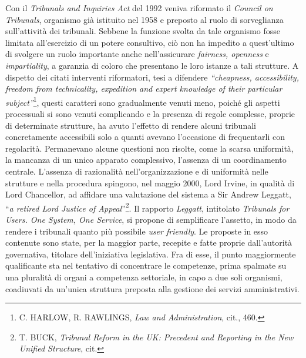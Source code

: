 \documentclass[12pt,it,a4paper,]{report}
\begin{document}
Con il \emph{Tribunals and Inquiries Act} del 1992 veniva riformato il
\emph{Council on Tribunals}, organismo già istituito nel 1958 e preposto
al ruolo di sorveglianza sull'attività dei tribunali. Sebbene la
funzione svolta da tale organismo fosse limitata all'esercizio di un
potere consultivo, ciò non ha impedito a quest'ultimo di svolgere un
ruolo importante anche nell'assicurare \emph{fairness, openness} e
\emph{impartiality}, a garanzia di coloro che presentano le loro istanze
a tali strutture. A dispetto dei citati interventi riformatori, tesi a
difendere \emph{``cheapness, accessibility, freedom from technicality,
expedition and expert knowledge of their particular
subject''}\footnote{C. HARLOW, R. RAWLINGS, \emph{Law and
  Administration}, cit., 460.}, questi caratteri sono gradualmente
venuti meno, poiché gli aspetti processuali si sono venuti complicando e
la presenza di regole complesse, proprie di determinate strutture, ha
avuto l'effetto di rendere alcuni tribunali concretamente accessibili
solo a quanti avevano l'occasione di frequentarli con regolarità.
Permanevano alcune questioni non risolte, come la scarsa uniformità, la
mancanza di un unico apparato complessivo, l'assenza di un coordinamento
centrale. L'assenza di razionalità nell'organizzazione e di uniformità
nelle strutture e nella procedura spingono, nel maggio 2000, Lord
Irvine, in qualità di Lord Chancellor, ad affidare una valutazione del
sistema a Sir Andrew Leggatt, ``\emph{a retired Lord Justice of
Appeal}''\footnote{T. BUCK, \emph{Tribunal Reform in the UK: Precedent
  and Reporting in the New Unified Structure}, cit.}. Il rapporto
\emph{Leggatt}, intitolato \emph{Tribunals for Users. One System, One
Service}, si propone di semplificare l'assetto, in modo da rendere i
tribunali quanto più possibile \emph{user friendly}. Le proposte in esso
contenute sono state, per la maggior parte, recepite e fatte proprie
dall'autorità governativa, titolare dell'iniziativa legislativa. Fra di
esse, il punto maggiormente qualificante sta nel tentativo di
concentrare le competenze, prima spalmate su una pluralità di organi a
competenza settoriale, in capo a due soli organismi, coadiuvati da
un'unica struttura preposta alla gestione dei servizi amministrativi.
\end{document}
